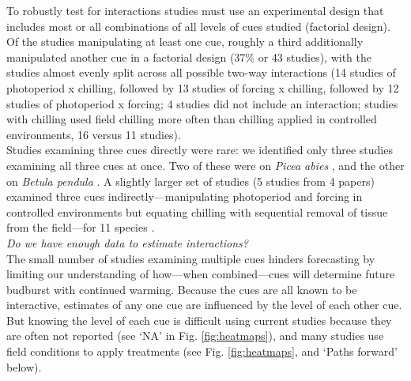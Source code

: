 \documentclass[11pt,letter]{article}
\begin{document}
To robustly test for interactions studies must use an experimental design that includes most or all combinations of all levels of cues studied (factorial design). Of the studies manipulating at least one cue, roughly a third additionally manipulated another cue in a factorial design (37\% or 43 studies), with the studies almost evenly split across all possible two-way interactions (14 studies of photoperiod x chilling, followed by 13 studies of forcing x chilling, followed by 12 studies of photoperiod x forcing; 4 studies did not include an interaction; studies with chilling used field chilling more often than chilling applied in controlled environments, 16 versus 11 studies). \\

Studies examining three cues directly were rare: we identified only three studies examining all three cues at once. Two of these were on \emph{Picea abies} \citep{Worrall:1967aa,Sogaard:2008aa}, and the other on \emph{Betula pendula} \citep{Skuterud:1994aa}. A slightly larger set of studies (5 studies from 4 papers) examined three cues indirectly---manipulating photoperiod and forcing in controlled environments but equating chilling with sequential removal of tissue from the field---for 11 species \citep{Schnabel:1987aa,Heide:1993,Partanen:1998aa,Basler:2014aa}. \\

\emph{Do we have enough data to estimate interactions?}\\
The small number of studies examining multiple cues hinders forecasting by limiting our understanding of how---when combined---cues will determine future budburst with continued warming. Because the cues are all known to be interactive, estimates of any one cue are influenced by the level of each other cue. But knowing the level of each cue is difficult using current studies because they are often not reported (see `NA' in Fig. \ref{fig:heatmaps}), and many studies use field conditions to apply treatments (see Fig. \ref{fig:heatmaps}, and `Paths forward' below).\\
\end{document}
